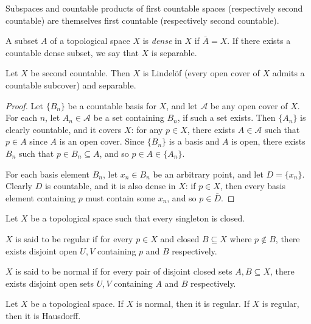 \begin{thm}
    Subspaces and countable products of first countable spaces (respectively second countable) are themselves first countable (respectively second countable).
\end{thm}

\begin{defn}
    A subset $A$ of a topological space $X$ is \emph{dense} in $X$ if $\bar{A} = X$. If there exists a countable dense subset, we say that $X$ is separable.
\end{defn}

\begin{thm}
    Let $X$ be second countable. Then $X$ is Lindel\"of (every open cover of $X$ admits a countable subcover) and separable.
\end{thm}

\begin{proof}
    Let $\{B_n\}$ be a countable basis for $X$, and let $\mathcal{A}$ be any open cover of $X$. For each $n$, let $A_n \in \mathcal{A}$ be a set containing $B_n$, if such a set exists. Then $\{A_n\}$ is clearly countable, and it covers $X$: for any $p \in X$, there exists $A \in \mathcal{A}$ such that $p \in A$ since $A$ is an open cover. Since $\{B_n\}$ is a basis and $A$ is open, there exists $B_n$ such that $p \in B_n \subseteq A$, and so $p \in A \in \{A_n\}$.

    For each basis element $B_n$, let $x_n \in B_n$ be an arbitrary point, and let $D = \{x_n\}$. Clearly $D$ is countable, and it is also dense in $X$: if $p \in X$, then every basis element containing $p$ must contain some $x_n$, and so $p \in \bar{D}$.
\end{proof}

\begin{defn}
    Let $X$ be a topological space such that every singleton is closed.

    $X$ is said to be regular if for every $p \in X$ and closed $B \subseteq X$ where $p \not\in B$, there exists disjoint open $U, V$ containing $p$ and $B$ respectively.

    $X$ is said to be normal if for every pair of disjoint closed sets $A, B \subseteq X$, there exists disjoint open sets $U, V$ containing $A$ and $B$ respectively.
\end{defn}

\begin{thm}
    Let $X$ be a topological space. If $X$ is normal, then it is regular. If $X$ is regular, then it is Hausdorff.
\end{thm}

